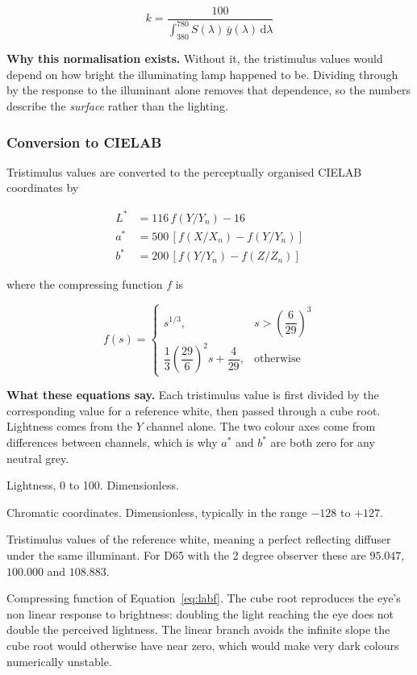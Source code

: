 \documentclass[11pt,a4paper]{article}
\newenvironment{symlist}
  {\vspace{-0.2em}\begin{list}{}{%
    \setlength{\leftmargin}{2.4em}\setlength{\labelwidth}{2.0em}%
    \setlength{\labelsep}{0.4em}\setlength{\itemsep}{1pt}%
    \setlength{\parsep}{0pt}\setlength{\topsep}{3pt}%
    \renewcommand{\makelabel}[1]{##1\hfil}}}
  {\end{list}}
\begin{document}
\begin{equation}
k = \frac{100}{\displaystyle\int_{380}^{780} S(\lambda)\,\bar{y}(\lambda)\,\mathrm{d}\lambda}
\label{eq:knorm}
\end{equation}

\noindent\textbf{Why this normalisation exists.} Without it, the tristimulus
values would depend on how bright the illuminating lamp happened to be. Dividing
through by the response to the illuminant alone removes that dependence, so the
numbers describe the \emph{surface} rather than the lighting.

\subsubsection{Conversion to CIELAB}

Tristimulus values are converted to the perceptually organised CIELAB
coordinates by

\begin{align}
L^* &= 116\,f(Y/Y_n) - 16 \label{eq:lab1}\\
a^* &= 500\,\left[f(X/X_n) - f(Y/Y_n)\right] \label{eq:lab2}\\
b^* &= 200\,\left[f(Y/Y_n) - f(Z/Z_n)\right] \label{eq:lab3}
\end{align}

where the compressing function $f$ is

\begin{equation}
f(s) =
\begin{cases}
s^{1/3}, & s > \left(\dfrac{6}{29}\right)^{3}\\[1.1em]
\dfrac{1}{3}\left(\dfrac{29}{6}\right)^{2} s + \dfrac{4}{29}, & \text{otherwise}
\end{cases}
\label{eq:labf}
\end{equation}

\noindent\textbf{What these equations say.} Each tristimulus value is first
divided by the corresponding value for a reference white, then passed through a
cube root. Lightness comes from the $Y$ channel alone. The two colour axes come
from differences between channels, which is why $a^*$ and $b^*$ are both zero
for any neutral grey.

\begin{symlist}
\item[$L^*$] Lightness, 0 to 100. Dimensionless.
\item[$a^*,b^*$] Chromatic coordinates. Dimensionless, typically in the range
$-128$ to $+127$.
\item[$X_n,Y_n,Z_n$] Tristimulus values of the reference white, meaning a
perfect reflecting diffuser under the same illuminant. For D65 with the 2 degree
observer these are $95.047$, $100.000$ and $108.883$.
\item[$f(s)$] Compressing function of Equation~\eqref{eq:labf}. The cube root
reproduces the eye's non linear response to brightness: doubling the light
reaching the eye does not double the perceived lightness. The linear branch
avoids the infinite slope the cube root would otherwise have near zero, which
would make very dark colours numerically unstable.
\end{symlist}
\end{document}
